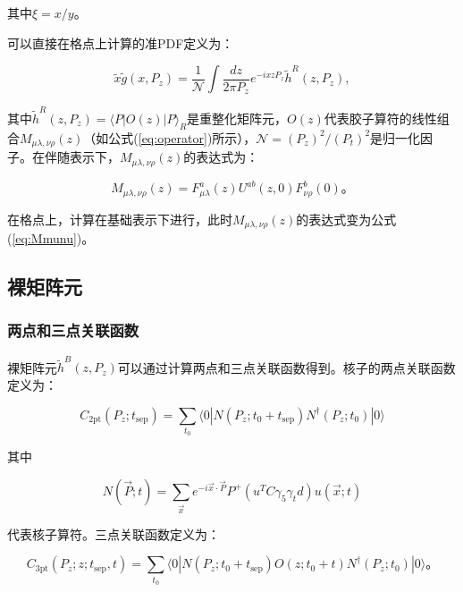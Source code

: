 \documentclass[12pt,a4paper]{ctexart}
\begin{document}
其中$\xi = x/y$。

可以直接在格点上计算的准PDF定义为：

\begin{equation}
\tilde{x}\tilde{g}(x, P_z) = \frac{1}{\mathcal{N}} \int \frac{dz}{2\pi P_z} e^{-ixzP_z} \tilde{h}^R(z, P_z),
\label{eq:quasi_pdf}
\end{equation}

其中$\tilde{h}^R(z, P_z) = \langle P|O(z)|P\rangle_R$是重整化矩阵元，$O(z)$代表胶子算符的线性组合$M_{\mu\lambda,\nu\rho}(z)$（如公式(\ref{eq:operator})所示），$\mathcal{N} = (P_z)^2/(P_t)^2$是归一化因子。在伴随表示下，$M_{\mu\lambda,\nu\rho}(z)$的表达式为：

\begin{equation}
M_{\mu\lambda,\nu\rho}(z) = F^a_{\mu\lambda}(z)U^{ab}(z,0)F^b_{\nu\rho}(0)。
\label{eq:Madjoint}
\end{equation}

在格点上，计算在基础表示下进行，此时$M_{\mu\lambda,\nu\rho}(z)$的表达式变为公式(\ref{eq:Mmunu})。

\subsection*{裸矩阵元}

\subsubsection*{两点和三点关联函数}

裸矩阵元$\tilde{h}^B(z, P_z)$可以通过计算两点和三点关联函数得到。核子的两点关联函数定义为：

\begin{equation}
C_{\text{2pt}}(P_z; t_{\text{sep}}) = \sum_{t_0} \langle 0|N(P_z; t_0 + t_{\text{sep}})N^\dagger(P_z; t_0)|0\rangle
\label{eq:2pt}
\end{equation}

其中

\begin{equation}
N(\vec{P}; t) = \sum_{\vec{x}} e^{-i\vec{x}\cdot\vec{P}} P^+(u^T C\gamma_5\gamma_t d)u(\vec{x}; t)
\label{eq:nucleon_op}
\end{equation}

代表核子算符\cite{Zhang2025}。三点关联函数定义为：

\begin{equation}
C_{\text{3pt}}(P_z; z; t_{\text{sep}}, t) = \sum_{t_0} \langle 0|N(P_z; t_0 + t_{\text{sep}})O(z; t_0 + t)N^\dagger(P_z; t_0)|0\rangle。
\label{eq:3pt}
\end{equation}
\end{document}
